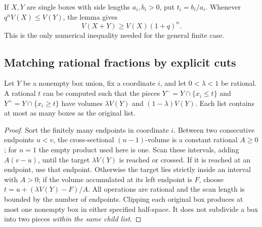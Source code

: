 If \(X,Y\) are single boxes with side lengths \(a_i,b_i>0\), put
\(t_i=b_i/a_i\). Whenever \(q^n V(X)\leq V(Y)\), the lemma gives
\begin{equation}\label{eq:box-base}
 V(X+Y)\geq V(X)(1+q)^n.
\end{equation}
This is the only numerical inequality needed for the general finite case.

\subsection{Matching rational fractions by explicit cuts}

\begin{lemma}\label{lem:rational-cut}
Let \(Y\) be a nonempty box union, fix a coordinate \(i\), and let
\(0<\lambda<1\) be rational. A rational \(t\) can be computed such
that the pieces \(Y^- =Y\cap\{x_i\leq t\}\) and
\(Y^+=Y\cap\{x_i\geq t\}\) have volumes
\(\lambda V(Y)\) and \((1-\lambda)V(Y)\).
Each list contains at most as many boxes as the original list.
\end{lemma}
\begin{proof}
Sort the finitely many endpoints in coordinate \(i\).
Between two consecutive endpoints \(u<v\), the cross-sectional
\((n-1)\)-volume is a constant rational \(A\geq0\); for \(n=1\)
the empty product used here is one. Scan these intervals, adding
\(A(v-u)\), until the target \(\lambda V(Y)\) is reached or crossed.
If it is reached at an endpoint, use that endpoint. Otherwise the target
lies strictly inside an interval with \(A>0\); if the volume accumulated
at its left endpoint is \(F\), choose
\(t=u+(\lambda V(Y)-F)/A\).
All operations are rational and the scan length is bounded by the number
of endpoints. Clipping each original box produces at most one nonempty
box in either specified half-space. It does not subdivide a box into
two pieces \emph{within the same child list}.
\end{proof}

